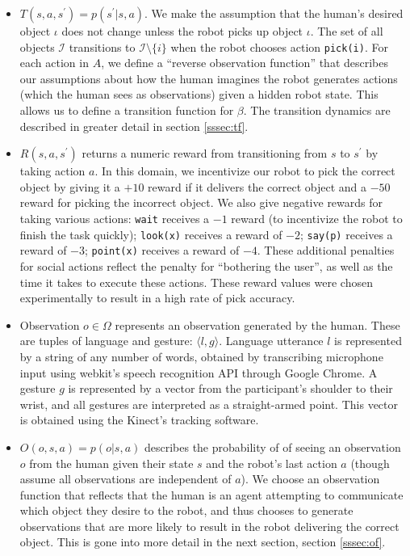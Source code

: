 \documentclass[conference]{IEEEtran}
\newcommand{\Iota}{\mathcal{I}}
\begin{document}
\begin{itemize}
	\item $T(s, a, s^\prime) = p(s^\prime | s, a)$. We make the assumption that the human's desired object $\iota$ does not change unless the robot picks up object $\iota$. The set of all objects $\Iota$ transitions to $\Iota \setminus \{i\}$ when the robot chooses action \texttt{pick(i)}. For each action in $A$, we define a ``reverse observation function'' that describes our assumptions about how the human imagines the robot generates actions (which the human sees as observations) given a hidden robot state. This allows us to define a transition function for $\beta$. The transition dynamics are described in greater detail in section  \ref{sssec:tf}. 
	\item $R(s, a, s^\prime)$ returns a numeric reward from transitioning from $s$ to $s^\prime$ by taking action $a$. In this domain, we incentivize our robot to pick the correct object by giving it a $+10$ reward if it delivers the correct object and a $-50$ reward for picking the incorrect object. We also give negative rewards for taking various actions: \texttt{wait} receives a $-1$ reward (to incentivize the robot to finish the task quickly); \texttt{look(x)} receives a reward of $-2$; \texttt{say(p)} receives a reward of $-3$; \texttt{point(x)}  receives a reward of $-4$. These additional penalties for social actions reflect the penalty for ``bothering the user'', as well as the time it takes to execute these actions. These reward values were chosen experimentally to result in a high rate of pick accuracy. 
	\item Observation $o \in \Omega$ represents an observation generated by the human. These are tuples of language and gesture: $\langle l, g \rangle$. Language utterance $l$ is represented by a string of any number of words, obtained by transcribing microphone input using webkit's speech recognition API through Google Chrome.  A gesture $g$ is represented by a vector from the participant's shoulder to their wrist, and all gestures are interpreted as a straight-armed point. This vector is obtained using the Kinect's tracking software. 
	\item $O(o, s, a) = p(o |s, a)$ describes the probability of of seeing an observation $o$ from the human given their state $s$ and the robot's last action $a$ (though assume all observations are independent of $a$). We choose an observation function that reflects that the human is an agent attempting to communicate which object they desire to the robot, and thus chooses to generate observations that are more likely to result in the robot delivering the correct object. This is gone into more detail in the next section, section \ref{sssec:of}. 
\end{itemize}
\end{document}
